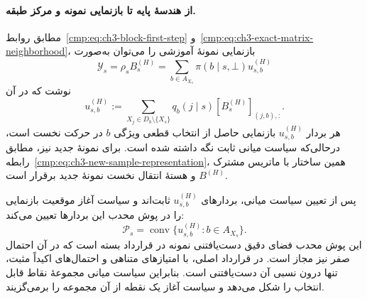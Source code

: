 \paragraph{از هندسهٔ پایه تا بازنمایی نمونه و مرکز طبقه.}
مطابق روابط~\eqref{cmp:eq:ch3-block-first-step} و~\eqref{cmp:eq:ch3-exact-matrix-neighborhood}، بازنمایی نمونهٔ آموزشی را می‌توان به‌صورت
\begin{equation}\label{cmp:eq:ch3-geometry-origin-representation}
\mathscr Y_s=\rho_sB_s^{(H)}=\sum_{b\in A_{X_s}}\pi(b\mid s,\bot)u_{s,b}^{(H)}
\end{equation}
نوشت که در آن
\begin{equation}\label{cmp:eq:ch3-geometry-initial-feature-points}
u_{s,b}^{(H)}:=\sum_{X_j\in D_b\setminus\{X_s\}}q_b(j\mid s)[B_s^{(H)}]_{(j,b),:}.
\end{equation}
هر بردار $u_{s,b}^{(H)}$ بازنمایی حاصل از انتخاب قطعی ویژگی $b$ در حرکت نخست است، درحالی‌که سیاست میانی ثابت نگه داشته شده است. برای نمونهٔ جدید نیز، مطابق رابطه~\eqref{cmp:eq:ch3-new-sample-representation}، همین ساختار با ماتریس مشترک $B^{(H)}$ و هستهٔ انتقال نخست نمونهٔ جدید برقرار است.

پس از تعیین سیاست میانی، بردارهای $u_{s,b}^{(H)}$ ثابت‌اند و سیاست آغاز موقعیت بازنمایی را در پوش محدب این بردارها تعیین می‌کند:
\begin{equation}\label{cmp:eq:ch3-geometry-sample-polytope}
\mathcal P_s=\operatorname{conv}\{u_{s,b}^{(H)}:b\in A_{X_s}\}.
\end{equation}
این پوش محدب فضای دقیق دست‌یافتنی نمونه در قرارداد بسته است که در آن احتمال صفر نیز مجاز است. در قرارداد اصلی، با امتیازهای متناهی و احتمال‌های اکیداً مثبت، تنها درون نسبی آن دست‌یافتنی است. بنابراین سیاست میانی مجموعهٔ نقاط قابل انتخاب را شکل می‌دهد و سیاست آغاز یک نقطه از آن مجموعه را برمی‌گزیند.


